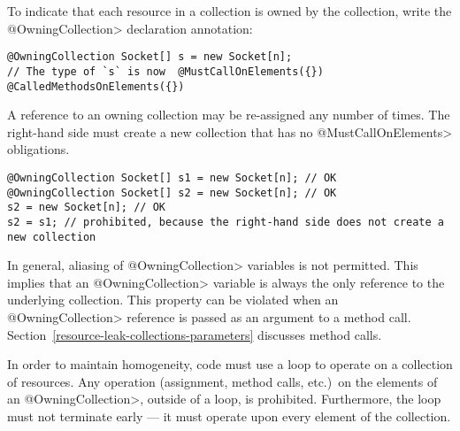 
To indicate that each resource in a collection is owned by the collection, write the \<@OwningCollection> declaration annotation:

\begin{Verbatim}
@OwningCollection Socket[] s = new Socket[n];
// The type of `s` is now  @MustCallOnElements({}) @CalledMethodsOnElements({})
\end{Verbatim}

A reference to an owning collection may be re-assigned any number of times.
The right-hand side must create a new collection that has no
\<@MustCallOnElements> obligations.

\begin{verbatim}
@OwningCollection Socket[] s1 = new Socket[n]; // OK
@OwningCollection Socket[] s2 = new Socket[n]; // OK
s2 = new Socket[n]; // OK
s2 = s1; // prohibited, because the right-hand side does not create a new collection
\end{verbatim}

In general, aliasing of \<@OwningCollection> variables is not permitted.
This implies that an \<@OwningCollection> variable is always the only
reference to the underlying collection.  This property can be violated when
an \<@OwningCollection> reference is passed as an argument to a method
call.  Section~\ref{resource-leak-collections-parameters} discusses method
calls.



In order to maintain homogeneity, code must use a loop to operate on a
collection of resources.  Any operation (assignment, method calls, etc.)\
on the elements of an \<@OwningCollection>, outside of a loop, is
prohibited.  Furthermore, the loop must not terminate early --- it must
operate upon every element of the collection.


